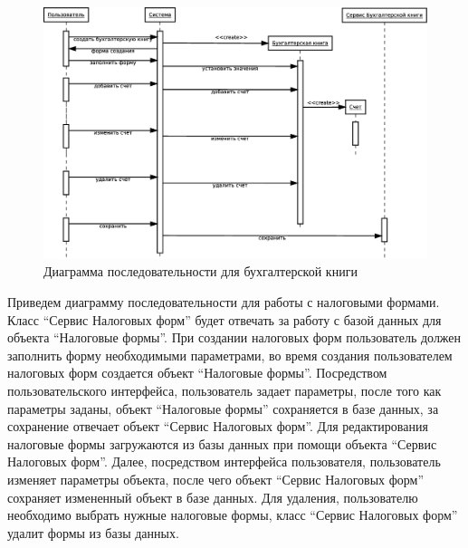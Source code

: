 \documentclass[14pt,a4paper]{reportmod}
\begin{document}
\begin{figure}
  \centering
  \includegraphics[scale=0.4]{uml/_sequence_5}
  \caption{Диаграмма последовательности для бухгалтерской книги}
  \label{pic:sequence_2}
\end{figure}

Приведем диаграмму последовательности для работы с налоговыми формами. Класс ``Сервис Налоговых форм'' будет отвечать за работу с базой данных для объекта ``Налоговые формы''. При создании налоговых форм пользователь должен заполнить форму необходимыми параметрами, во время создания пользователем налоговых форм создается объект ``Налоговые формы''. Посредством пользовательского интерфейса, пользователь задает параметры, после того как параметры заданы, объект ``Налоговые формы'' сохраняется в базе данных, за сохранение отвечает объект ``Сервис Налоговых форм''. Для редактирования налоговые формы загружаются из базы данных при помощи объекта ``Сервис Налоговых форм''. Далее, посредством интерфейса пользователя, пользователь изменяет параметры объекта, после чего объект ``Сервис Налоговых форм'' сохраняет измененный объект в базе данных. Для удаления, пользователю необходимо выбрать нужные налоговые формы, класс ``Сервис Налоговых форм'' удалит формы из базы данных.
\end{document}
